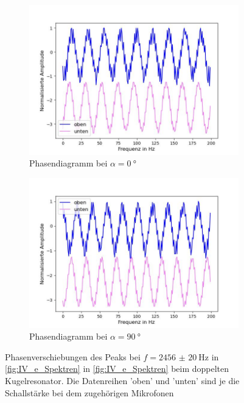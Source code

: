 \documentclass[../main.tex]{subfiles}
\begin{document}
        \begin{figure}[H]
            \centering
            \begin{subfigure}[b]{0.45\textwidth}
                \centering
                \includegraphics[width=\textwidth]{Bilddateien/Auswertung/IV_j_Phasen2456_0Grad.jpg}
                \caption{Phasendiagramm bei $\alpha=\SI{0}{\degree}$}
                \label{fig:IV_j_Phasen2456_0Grad}
            \end{subfigure}
            \hfill
            \begin{subfigure}[b]{0.45\textwidth}
                \centering
                \includegraphics[width=\textwidth]{Bilddateien/Auswertung/IV_j_Phasen2456_90Grad.jpg}
                \caption{Phasendiagramm bei $\alpha=\SI{90}{\degree}$}
                \label{fig:IV_j_Phasen2456_90Grad}
            \end{subfigure}
            \caption{Phasenverschiebungen des Peaks bei $f=\SI{2456(20)}{\hertz}$ in \ref{fig:IV_e_Spektren} in \ref{fig:IV_e_Spektren} beim doppelten Kugelresonator. Die Datenreihen 'oben' und 'unten' sind je die Schallstärke bei dem zugehörigen Mikrofonen}
            \label{fig:IV_j_Phasendiagramme_2456}
        \end{figure}
\end{document}
